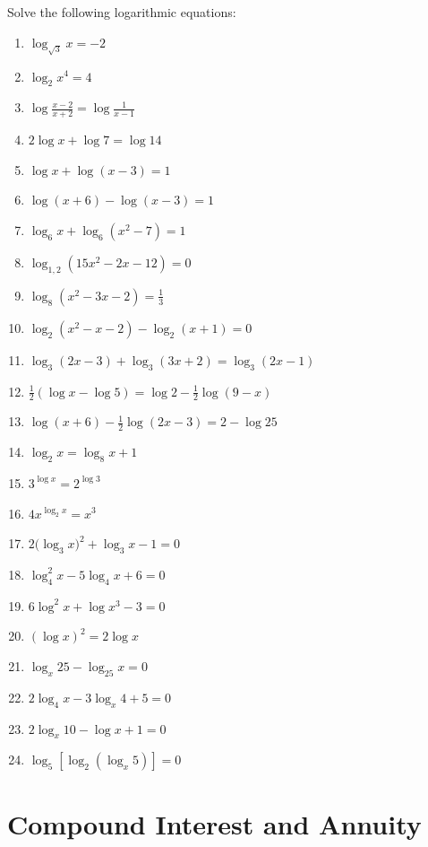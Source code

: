\documentclass[12pt]{report}
\begin{document}
\setlength{\columnseprule}{1pt}
\setlength{\columnsep}{24pt}
\begin{multicols}{2}
    Solve the following logarithmic equations:
    \begin{enumerate}
        \item $\log_{\sqrt{3}}x=-2$
        \item $\log_{2}x^{4}=4$
        \item $\log{\frac{x-2}{x+2}}=\log{\frac{1}{x-1}}$
        \item $2\log x+\log7=\log14$
        \item $\log x+\log\left(x-3\right)=1$
        \item $\log\left(x+6\right)-\log\left(x-3\right)=1$
        \item $\log_{6}x+\log_{6}(x^{2}-7)=1$
        \item $\log_{1,2}(15x^{2}-2x-12)=0$
        \item $\log_{8}(x^{2}-3x-2)={\frac{1}{3}}$
        \item $\log_{2}(x^{2}-x-2)-\log_{2}(x+1)=0$
        \item $\log_{3}(2x-3)+\log_{3}(3x+2)=\log_{3}(2x-1)$
        \item $\frac{1}{2}(\log x-\log5)=\log2-\frac{1}{2}\log(9-x)$
        \item $\log\left(x+6\right)-{\frac{1}{2}}\log\left(2x-3\right)=2-\log25$
        \item $\log_{2}x=\log_{8}x+1$
        \item $3^{\log x}=2^{\log3}$
        \item $4x^{\log_{2}x}=x^{3}$
        \item $2\bigl(\log_{3}x\bigr)^{2}+\log_{3}x-1=0$
        \item $\log_{4}^{2}x-5\log_{4}x+6=0$
        \item $6\log^{2}x+\log x^{3}-3=0$
        \item $(\log x)^{2}=2\log x$
        \item $\log_{x}25-\log_{25}x=0$
        \item $2\log_{4}x-3\log_{x}4+5=0$
        \item $2\log_{x}10-\log x+1=0$
        \item $\log_{5}\left[\log_{2}\left(\log_{x}5\right)\right]=0$
    \end{enumerate}
\end{multicols}

\section{Compound Interest and Annuity}
\end{document}

